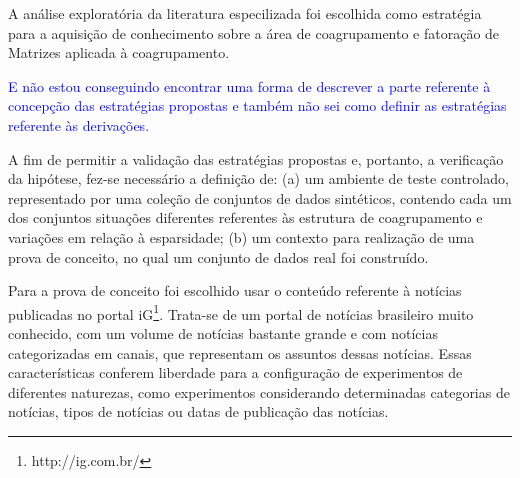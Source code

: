 \documentclass[
    12pt,                %
    oneside,            %
    a4paper,            %
    english,            %
    brazil                %
    ]{abntex2ppgsi}
\begin{document}
A análise exploratória da literatura especilizada foi escolhida como estratégia para a aquisição de conhecimento sobre a área de coagrupamento e fatoração de Matrizes aplicada à coagrupamento.

\textcolor{blue}{E não estou conseguindo encontrar uma forma de descrever a parte referente à concepção das estratégias propostas e também não sei como definir as estratégias referente às derivações.}


A fim de permitir a validação das estratégias propostas e, portanto, a verificação da  hipótese, fez-se necessário a definição de: (a) um ambiente de teste controlado, representado por uma coleção de conjuntos de dados sintéticos, contendo cada um dos conjuntos situações diferentes referentes às estrutura de coagrupamento e variações em relação à esparsidade;  (b) um contexto para realização de uma prova de conceito, no qual um conjunto de dados real foi construído.

Para a prova de conceito foi escolhido usar o conteúdo referente à notícias publicadas no portal iG\footnote{http://ig.com.br/}.
Trata-se de um portal de notícias brasileiro muito conhecido, com um volume de notícias bastante grande e com notícias categorizadas em canais, que representam os assuntos dessas notícias. Essas características conferem liberdade para a configuração de experimentos de diferentes naturezas, como experimentos considerando determinadas categorias de notícias, tipos de notícias ou datas de publicação das notícias.
\end{document}
